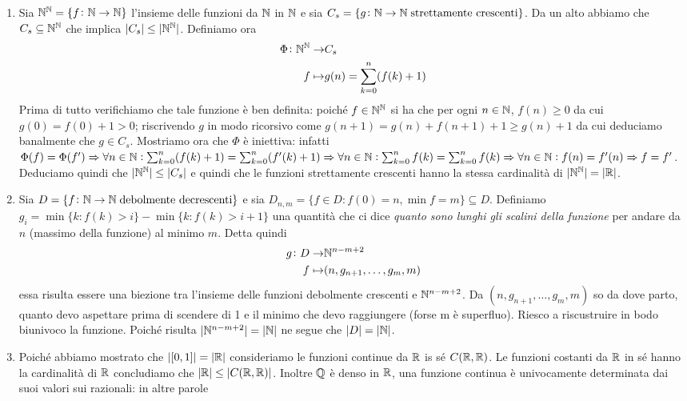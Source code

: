 \documentclass[a4paper]{article}\par \usepackage{style}\par
\begin{document}
\begin{enumerate}
\item Sia $ \mathbb{N}^{\mathbb{N}} = \{f \colon \mathbb{N} \to \mathbb{N}\} $ l'insieme delle funzioni da $ \mathbb{N} $ in $ \mathbb{N} $ e sia $ C_s = \{g \colon \mathbb{N} \to \mathbb{N} \; \text{strettamente crescenti}\} $. Da un alto abbiamo che $ C_s \subseteq \mathbb{N}^{\mathbb{N}} $ che implica $ |C_s| \leq |\mathbb{N}^{\mathbb{N}}| $. Definiamo ora
  \begin{align*}
    \Phi \colon \mathbb{N}^{\mathbb{N}} \to & C_s \\
    f \mapsto & g(n) = \sum_{k = 0}^{n} (f(k) + 1)
  \end{align*}
  Prima di tutto verifichiamo che tale funzione è ben definita: poiché $ f \in \mathbb{N}^{\mathbb{N}} $ si ha che per ogni $ n \in \mathbb{N} $, $ f(n) \geq 0 $ da cui $ g(0) = f(0) + 1 > 0 $; riscrivendo $ g $ in modo ricorsivo come $ g(n + 1) = g(n) + f(n + 1) + 1 \geq g(n) + 1 $ da cui deduciamo banalmente che $ g \in C_s $. Mostriamo ora che $ \Phi $ è iniettiva: infatti $ \Phi(f) = \Phi(f') \Rightarrow \forall n \in \mathbb{N} :  \sum_{k = 0}^{n} (f(k) + 1) = \sum_{k = 0}^{n} (f'(k) + 1) \Rightarrow \forall n \in \mathbb{N} : \sum_{k = 0}^{n} f(k) = \sum_{k = 0}^{n} f(k) \Rightarrow \forall n \in \mathbb{N} : f(n) = f'(n) \Rightarrow f = f' $. Deduciamo quindi che $ |\mathbb{N}^{\mathbb{N}}| \leq |C_s| $ e quindi che le funzioni strettamente crescenti hanno la stessa cardinalità di $ |\mathbb{N}^{\mathbb{N}}| = |\mathbb{R}| $.
\item Sia $ D = \{f \colon \mathbb{N} \to \mathbb{N} \; \text{debolmente decrescenti}\} $ e sia $ D_{n, m} = \{f \in D : f(0) = n, \min f = m\} \subseteq D $. Definiamo $ g_i = \min\{k : f(k) > i\} - \min\{k : f(k) > i + 1\} $ una quantità che ci dice \emph{quanto sono lunghi gli scalini della funzione} per andare da $ n $ (massimo della funzione) al minimo $ m $. Detta quindi
  \begin{align*}
    g \colon D \to & \mathbb{N}^{n - m + 2} \\
    f \mapsto & (n, g_{n + 1}, \dots, g_{m}, m)
  \end{align*}
  essa risulta essere una biezione tra l'insieme delle funzioni debolmente crescenti e $ \mathbb{N}^{n - m + 2} $. \textsf{Da $ (n, g_{n + 1}, \dots, g_{m}, m) $ so da dove parto, quanto devo aspettare prima di scendere di 1 e il minimo che devo raggiungere (forse m è superfluo). Riesco a riscustruire in bodo biunivoco la funzione.} Poiché risulta $ |\mathbb{N}^{n - m + 2}| = |\mathbb{N}| $ ne segue che $ |D| = |\mathbb{N}| $.
\item Poiché abbiamo mostrato che $ |[0, 1]| = |\mathbb{R}| $ consideriamo le funzioni continue da $ \mathbb{R} $ is sé $ C(\mathbb{R}, \mathbb{R}) $. Le funzioni costanti da $ \mathbb{R} $ in sé hanno la cardinalità di $ \mathbb{R} $ concludiamo che $ |\mathbb{R}| \leq |C(\mathbb{R}, \mathbb{R})| $. Inoltre $ \mathbb{Q} $ è denso in $ \mathbb{R} $, una funzione continua è univocamente determinata dai suoi valori sui razionali: in altre parole

\end{enumerate}
\end{document}

